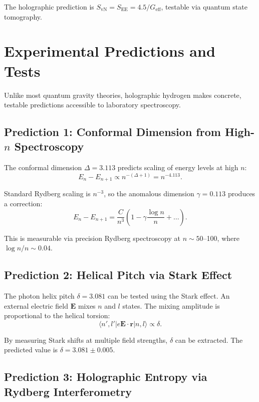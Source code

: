 \documentclass[aps,prd,twocolumn,superscriptaddress,floatfix]{revtex4-2}
\begin{document}
The holographic prediction is $S_{\text{vN}} = S_{\text{EE}} = 4.5 / G_{\text{eff}}$, testable via quantum state tomography.


\section{Experimental Predictions and Tests}

Unlike most quantum gravity theories, holographic hydrogen makes concrete, testable predictions accessible to laboratory spectroscopy.

\subsection{Prediction 1: Conformal Dimension from High-$n$ Spectroscopy}

The conformal dimension $\Delta = 3.113$ predicts scaling of energy levels at high $n$:
\begin{equation}
E_n - E_{n+1} \propto n^{-(\Delta+1)} = n^{-4.113}.
\end{equation}

Standard Rydberg scaling is $n^{-3}$, so the anomalous dimension $\gamma = 0.113$ produces a correction:
\begin{equation}
E_n - E_{n+1} = \frac{C}{n^3} \left(1 - \gamma \frac{\log n}{n} + \ldots \right).
\end{equation}

This is measurable via precision Rydberg spectroscopy at $n \sim 50$--100, where $\log n / n \sim 0.04$.

\subsection{Prediction 2: Helical Pitch via Stark Effect}

The photon helix pitch $\delta = 3.081$ can be tested using the Stark effect. An external electric field $\mathbf{E}$ mixes $n$ and $l$ states. The mixing amplitude is proportional to the helical torsion:
\begin{equation}
\langle n', l' | e\mathbf{E} \cdot \mathbf{r} | n, l \rangle \propto \delta.
\end{equation}

By measuring Stark shifts at multiple field strengths, $\delta$ can be extracted. The predicted value is $\delta = 3.081 \pm 0.005$.

\subsection{Prediction 3: Holographic Entropy via Rydberg Interferometry}
\end{document}
